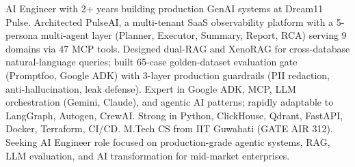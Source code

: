 \documentclass[11pt,a4paper,sans]{moderncv}
\begin{document}
\makecvtitle


\vspace{6pt}
\small{AI Engineer with 2+ years building production GenAI systems at Dream11 Pulse. Architected PulseAI, a multi-tenant SaaS observability platform with a 5-persona multi-agent layer (Planner, Executor, Summary, Report, RCA) serving 9 domains via 47 MCP tools. Designed dual-RAG and XenoRAG for cross-database natural-language queries; built 65-case golden-dataset evaluation gate (Promptfoo, Google ADK) with 3-layer production guardrails (PII redaction, anti-hallucination, leak defense). Expert in Google ADK, MCP, LLM orchestration (Gemini, Claude), and agentic AI patterns; rapidly adaptable to LangGraph, Autogen, CrewAI. Strong in Python, ClickHouse, Qdrant, FastAPI, Docker, Terraform, CI/CD. M.Tech CS from IIT Guwahati (GATE AIR 312). Seeking AI Engineer role focused on production-grade agentic systems, RAG, LLM evaluation, and AI transformation for mid-market enterprises.}

\end{document}
